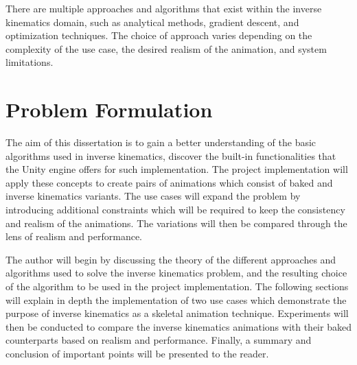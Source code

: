 There are multiple approaches and algorithms that exist within the inverse
kinematics domain, such as analytical methods, gradient descent, and
optimization techniques. The choice of approach varies depending on the
complexity of the use case, the desired realism of the animation, and system
limitations.

\section{Problem Formulation}

The aim of this dissertation is to gain a better understanding of the basic
algorithms used in inverse kinematics, discover the built-in functionalities
that the Unity engine offers for such implementation. The project implementation
will apply these concepts to create pairs of animations which consist of baked
and inverse kinematics variants. The use cases will expand the problem by
introducing additional constraints which will be required to keep the
consistency and realism of the animations. The variations will then be compared
through the lens of realism and performance.

The author will begin by discussing the theory of the different approaches and
algorithms used to solve the inverse kinematics problem, and the resulting
choice of the algorithm to be used in the project implementation. The following
sections will explain in depth the implementation of two use cases which
demonstrate the purpose of inverse kinematics as a skeletal animation technique.
Experiments will then be conducted to compare the inverse kinematics animations
with their baked counterparts based on realism and performance. Finally,
a summary and conclusion of important points will be presented to the reader.
